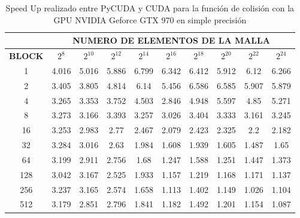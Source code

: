 \begin{table}[t!]
\centering
    \begin{tabular}{|c|c|c|c|c|c|c|c|c|c|}
    \hline
                   & \multicolumn{9}{c|}{\textbf{NUMERO DE ELEMENTOS DE LA MALLA}} \\ \hline
    \textbf{BLOCK} & $2^{8}$ & $2^{10}$& $2^{12}$& $2^{14}$& $2^{16}$& $2^{18}$& $2^{20}$& $2^{22}$& $2^{24}$\\ \hline
		1                               & 4.016   & 5.016    & 5.886    & 6.799    & 6.342    & 6.412    & 5.912    & 6.12     & 6.266 \\ \hline
		2                               & 3.405   & 3.805    & 4.814    & 6.14     & 5.456    & 6.586    & 6.585    & 5.907    & 5.879 \\ \hline
		4                               & 3.265   & 3.353    & 3.752    & 4.503    & 2.846    & 4.948    & 5.597    & 4.85     & 5.271 \\ \hline
		8                               & 3.273   & 3.166    & 3.393    & 3.257    & 3.026    & 3.404    & 3.333    & 3.161    & 3.245 \\ \hline
		16                              & 3.253   & 2.983    & 2.77     & 2.467    & 2.079    & 2.423    & 2.325    & 2.2      & 2.182 \\ \hline
		32                              & 3.284   & 3.016    & 2.63     & 1.984    & 1.608    & 1.939    & 1.605    & 1.487    & 1.65  \\ \hline
		64                              & 3.199   & 2.911    & 2.756    & 1.68     & 1.247    & 1.588    & 1.251    & 1.447    & 1.373 \\ \hline
		128                             & 3.042   & 3.167    & 2.525    & 1.933    & 1.157    & 1.219    & 1.168    & 1.171    & 1.137 \\ \hline
		256                             & 3.237   & 3.165    & 2.574    & 1.658    & 1.113    & 1.402    & 1.149    & 1.026    & 1.104 \\ \hline
		512                             & 3.179   & 2.851    & 2.796    & 1.841    & 1.182    & 1.492    & 1.201    & 1.154    & 1.087 \\ \hline
    \end{tabular}
    \caption{Speed Up realizado entre PyCUDA y CUDA para la función de colisión con la GPU NVIDIA Geforce GTX 970 en simple precisión}
    \label{tab:s_py_970_test_simple_10}
    \end{table}